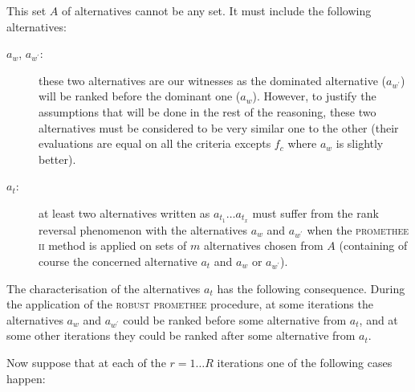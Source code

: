 This set $A$ of alternatives cannot be any set. It must include the following alternatives:

\begin{description}
    \item[$a_w$, $a_{w^{\prime}}$: ] these two alternatives are our witnesses as the dominated alternative ($a_{w^{\prime}}$) will be ranked before the dominant one ($a_w$). However, to justify the assumptions that will be done in the rest of the reasoning, these two alternatives must be considered to be very similar one to the other (their evaluations are equal on all the criteria excepts $f_c$ where $a_w$ is slightly better).
    \item[$a_t$:] at least two alternatives written as $a_{t_1} \dots a_{t_x}$ must suffer from the rank reversal phenomenon with the alternatives $a_w$ and $a_{w^{\prime}}$ when the \textsc{promethee ii} method is applied on sets of $m$ alternatives chosen from $A$ (containing of course the concerned alternative $a_t$ and $a_w$ or $a_{w^{\prime}}$).
\end{description}

The characterisation of the alternatives $a_t$ has the following consequence. During the application of the \textsc{robust promethee} procedure, at some iterations the alternatives $a_w$ and $a_{w^{\prime}}$ could be ranked before some alternative from $a_t$, and at some other iterations they could be ranked after some alternative from $a_t$.

Now suppose that at each of the $r=1 \dots R$ iterations one of the following cases happen:

